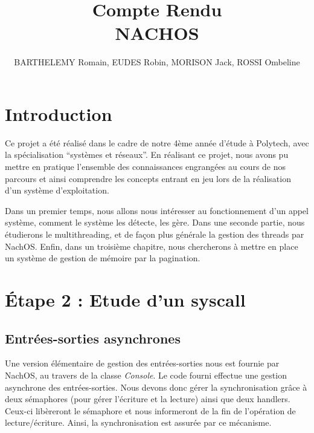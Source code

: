 \documentclass[a4paper,10pt]{article}
\title{Compte Rendu \\ NACHOS}
\author{BARTHELEMY Romain, EUDES Robin, MORISON Jack, ROSSI Ombeline}
\begin{document}
\maketitle
\tableofcontents
\newpage
\section{Introduction}
Ce projet a été réalisé dans le cadre de notre 4ème année d'étude à Polytech, avec la spécialisation ``systèmes et réseaux''.
En réalisant ce projet, nous avons pu mettre en pratique l'ensemble des connaissances engrangées au cours de nos parcours et ainsi
comprendre les concepts entrant en jeu lors de la réalisation d'un système d'exploitation.
\vspace{0.5cm}

Dans un premier temps, nous allons nous intéresser au fonctionnement d'un appel système, comment le système les détecte, les gère.
Dans une seconde partie, nous étudierons le multithreading, et de façon plus générale la gestion des threads par NachOS.
Enfin, dans un troisième chapitre, nous chercherons à mettre en place un système de gestion de mémoire par la pagination.


\newpage
\section{Étape 2 : Etude d'un syscall}
\subsection{Entrées-sorties asynchrones}
Une version élémentaire de gestion des entrées-sorties nous est fournie par NachOS, au travers de la classe \textit{Console}. Le code fourni
effectue une  gestion asynchrone des entrées-sorties. Nous devons donc gérer la synchronisation grâce à deux sémaphores (pour gérer l'écriture et la lecture)
ainsi que deux handlers. Ceux-ci libèreront le sémaphore et nous informeront de la fin de l'opération de lecture/écriture. Ainsi, la synchronisation est assurée
par ce mécanisme.
\end{document}

